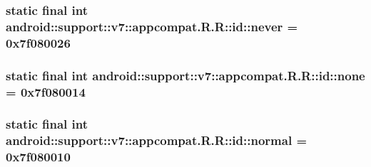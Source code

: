 \hypertarget{classandroid_1_1support_1_1v7_1_1appcompat_1_1_r_1_1id_27aeed36bce935844d879025feb126f3}{
\subsubsection[{never}]{\setlength{\rightskip}{0pt plus 5cm}static final int android::support::v7::appcompat.R.R::id::never = 0x7f080026}}
\label{classandroid_1_1support_1_1v7_1_1appcompat_1_1_r_1_1id_27aeed36bce935844d879025feb126f3}


\hypertarget{classandroid_1_1support_1_1v7_1_1appcompat_1_1_r_1_1id_7fd0fd3759be95806178e2003a0cfbba}{
\subsubsection[{none}]{\setlength{\rightskip}{0pt plus 5cm}static final int android::support::v7::appcompat.R.R::id::none = 0x7f080014}}
\label{classandroid_1_1support_1_1v7_1_1appcompat_1_1_r_1_1id_7fd0fd3759be95806178e2003a0cfbba}


\hypertarget{classandroid_1_1support_1_1v7_1_1appcompat_1_1_r_1_1id_efac8d1aeb782c09cb6f33554eb790c3}{
\subsubsection[{normal}]{\setlength{\rightskip}{0pt plus 5cm}static final int android::support::v7::appcompat.R.R::id::normal = 0x7f080010}}
\label{classandroid_1_1support_1_1v7_1_1appcompat_1_1_r_1_1id_efac8d1aeb782c09cb6f33554eb790c3}


